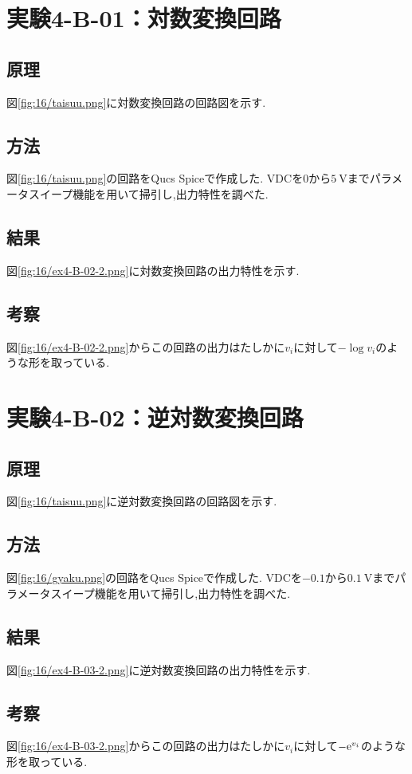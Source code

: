 \section{実験4-B-01：対数変換回路}
\subsection{原理}
図\ref{fig:16/taisuu.png}に対数変換回路の回路図を示す.
\subsection{方法}
図\ref{fig:16/taisuu.png}の回路をQucs Spiceで作成した.
VDCを$0$から$5\ \si{\volt}$までパラメータスイープ機能を用いて掃引し,出力特性を調べた.
\subsection{結果}
図\ref{fig:16/ex4-B-02-2.png}に対数変換回路の出力特性を示す.
\subsection{考察}
図\ref{fig:16/ex4-B-02-2.png}からこの回路の出力はたしかに$v_i$に対して$-\log v_i$のような形を取っている.
\clearpage
\section{実験4-B-02：逆対数変換回路}
\subsection{原理}
図\ref{fig:16/taisuu.png}に逆対数変換回路の回路図を示す.
\subsection{方法}
図\ref{fig:16/gyaku.png}の回路をQucs Spiceで作成した.
VDCを$-0.1$から$0.1\ \si{\volt}$までパラメータスイープ機能を用いて掃引し,出力特性を調べた.
\subsection{結果}
図\ref{fig:16/ex4-B-03-2.png}に逆対数変換回路の出力特性を示す.
\subsection{考察}
図\ref{fig:16/ex4-B-03-2.png}からこの回路の出力はたしかに$v_i$に対して$-{\rm e}^{v_i}$のような形を取っている.
